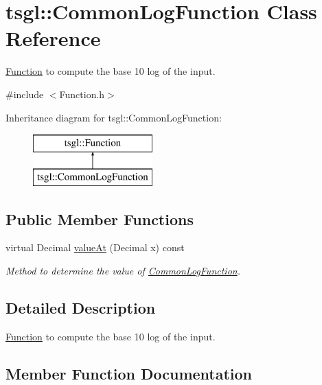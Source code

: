 \hypertarget{classtsgl_1_1_common_log_function}{}\section{tsgl\+:\+:Common\+Log\+Function Class Reference}
\label{classtsgl_1_1_common_log_function}


\hyperlink{classtsgl_1_1_function}{Function} to compute the base 10 log of the input.  




{\ttfamily \#include $<$Function.\+h$>$}

Inheritance diagram for tsgl\+:\+:Common\+Log\+Function\+:\begin{figure}[H]
\begin{center}
\leavevmode
\includegraphics[height=2.000000cm]{classtsgl_1_1_common_log_function}
\end{center}
\end{figure}
\subsection*{Public Member Functions}
\begin{DoxyCompactItemize}
\item 
virtual Decimal \hyperlink{classtsgl_1_1_common_log_function_a18f2c4f8779309e0d1c936a0589b1f3a}{value\+At} (Decimal x) const
\begin{DoxyCompactList}\small\item\em Method to determine the value of \hyperlink{classtsgl_1_1_common_log_function}{Common\+Log\+Function}. \end{DoxyCompactList}\end{DoxyCompactItemize}


\subsection{Detailed Description}
\hyperlink{classtsgl_1_1_function}{Function} to compute the base 10 log of the input. 

\subsection{Member Function Documentation}
\mbox{\label{classtsgl_1_1_common_log_function_a18f2c4f8779309e0d1c936a0589b1f3a}} 
